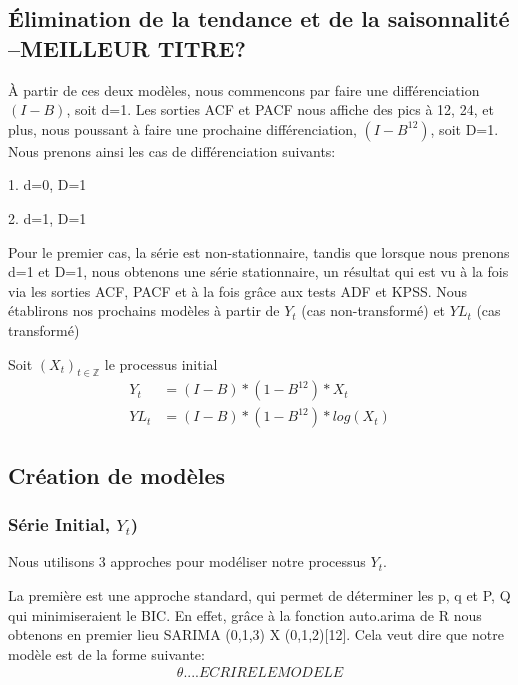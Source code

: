 \documentclass[12pt,a4paper]{book}
\newcommand{\1}{\mathds{1}}
\begin{document}
\vspace{5 mm}
\subsection{Élimination de la tendance et de la saisonnalité --MEILLEUR TITRE?}

\vspace{5 mm}
À partir de ces deux modèles, nous commencons par faire une différenciation $(I-B)$, soit d=1. Les sorties ACF et PACF nous affiche des pics à 12, 24, et plus, nous poussant à faire une prochaine différenciation, $(I-B^{12})$, soit D=1. Nous prenons ainsi les cas de différenciation suivants:
\begin{description}
  \item 1. d=0, D=1
  \item 2. d=1, D=1
\end{description}
\noindent 
Pour le premier cas, la série est non-stationnaire, tandis que lorsque nous prenons d=1 et D=1, nous obtenons une série stationnaire, un résultat qui est vu à la fois via les sorties ACF, PACF et à la fois grâce aux tests ADF et KPSS. Nous établirons nos prochains modèles à partir de $Y_t$ (cas non-transformé) et $YL_t$ (cas transformé)

\noindent 
Soit $(X_t)_{t\in \mathbb{Z}}$ le processus initial
\begin{align*}
Y_t &= (I-B) * (1-B^{12}) * X_t \\ 
YL_t &= (I-B) * (1-B^{12}) * log(X_t)
\end{align*}



\vspace{5 mm}
\subsection{Création de modèles}

\vspace{5 mm}
\subsubsection{Série Initial, $Y_t$)}

Nous utilisons 3 approches pour modéliser notre processus $Y_t$.

La première est une approche standard, qui permet de déterminer les p, q et P, Q qui minimiseraient le BIC. En effet, grâce à la fonction auto.arima de R nous obtenons en premier lieu SARIMA (0,1,3) X (0,1,2)[12]. Cela veut dire que notre modèle est de la forme suivante:
\begin{align*}
\theta ....ECRIRE LE MODELE
\end{align*}
\end{document}
